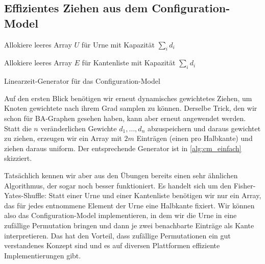 \subsection{Effizientes Ziehen aus dem Configuration-Model}
\begin{algorithm}[t]



    Allokiere leeres Array $U$ für Urne mit Kapazität $\sum_i d_i$\;

    Allokiere leeres Array $E$ für Kantenliste mit Kapazität $\sum_i d_i$\;

    \caption{Linearzeit-Generator für das Configuration-Model}
    \label{alg:cm_einfach}
\end{algorithm}


Auf den ersten Blick benötigen wir erneut dynamisches gewichtetes Ziehen, um Knoten gewichtete nach ihrem Grad samplen zu können.
Derselbe Trick, den wir schon für BA-Graphen gesehen haben, kann aber erneut angewendet werden.
Statt die $n$ veränderlichen Gewichte $d_1, \ldots, d_n$ abzuspeichern und daraus gewichtet zu ziehen, erzeugen wir ein Array mit $2m$ Einträgen (einen pro Halbkante) und ziehen daraus uniform.
Der entsprechende Generator ist in \cref{alg:cm_einfach} skizziert.

Tatsächlich kennen wir aber aus den Übungen bereits einen sehr ähnlichen Algorithmus, der sogar noch besser funktioniert.
Es handelt sich um den Fisher-Yates-Shuffle: Statt einer Urne und einer Kantenliste benötigen wir nur ein Array, das für jedes entnommene Element der Urne eine Halbkante fixiert.
Wir können also das Configuration-Model implementieren, in dem wir die Urne in eine zufällige Permutation bringen und dann je zwei benachbarte Einträge als Kante interpretieren.
Das hat den Vorteil, dass zufällige Permutationen ein gut verstandenes Konzept sind und es auf diversen Plattformen effiziente Implementierungen gibt.

